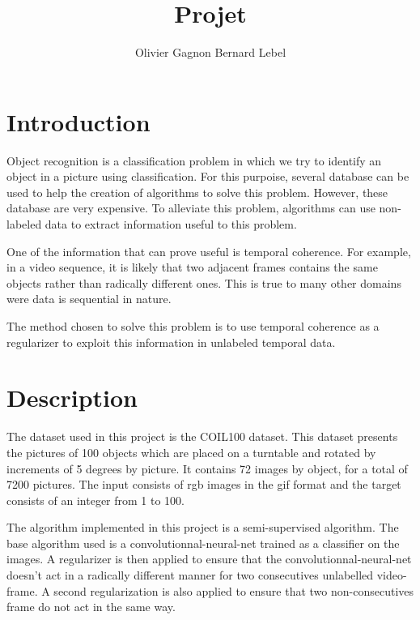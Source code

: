 \documentclass{article} %
\title{Projet}
\author{
Olivier Gagnon \And Bernard Lebel
}
\begin{document}
\maketitle

\begin{abstract}

\end{abstract}

\section{Introduction}

Object recognition is a classification problem in which we try to identify an object in a picture using classification. For this purpoise, several database can be used to help the creation of algorithms to solve this problem. However, these database are very expensive. To alleviate this problem, algorithms can use non-labeled data to extract information useful to this problem.

One of the information that can prove useful is temporal coherence. For example, in a video sequence, it is likely that two adjacent frames contains the same objects rather than radically different ones. This is true to many other domains were data is sequential in nature.

The method chosen to solve this problem is to use temporal coherence as a regularizer to exploit this information in unlabeled temporal data\cite{?}.

\section{Description}
The dataset used in this project is the COIL100 dataset\cite{?}. This dataset presents the pictures of 100 objects which are placed on a turntable and rotated by increments of 5 degrees by picture. It contains 72 images by object, for a total of 7200 pictures. The input consists of rgb images in the gif format and the target consists of an integer from 1 to 100.

The algorithm implemented in this project is a semi-supervised algorithm. The base algorithm used is a convolutionnal-neural-net trained as a classifier on the images.\cite{?} A regularizer is then applied to ensure that the convolutionnal-neural-net doesn't act in a radically different manner for two consecutives unlabelled video-frame. A second regularization is also applied to ensure that two non-consecutives frame do not act in the same way.
\end{document}
